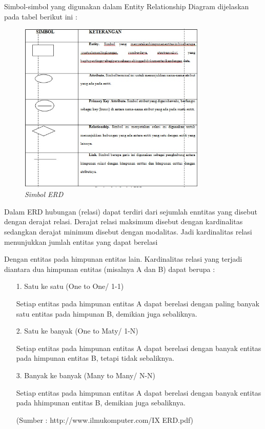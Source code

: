 \documentclass{jtetiproposalskripsi}
\begin{document}
Simbol-simbol yang digunakan dalam Entity Relationship Diagram dijelaskan pada tabel berikut ini :
\begin{figure}[ht!]
\centering
\includegraphics[width=0.8\textwidth]{gambar/Simbol-ERD}
\caption{\textit{Simbol ERD}}
\label{wsn}
\end{figure}
\newpage

Dalam ERD hubungan (relasi) dapat terdiri dari sejumlah enntitas yang disebut dengan derajat relasi. Derajat relasi maksimum disebut dengan kardinalitas sedangkan derajat minimum disebut dengan modalitas. Jadi kardinalitas relasi menunjukkan jumlah entitas yang dapat berelasi
	
Dengan entitas pada himpunan entitas lain. Kardinalitas relasi yang terjadi diantara dua himpunan entitas (misalnya A dan B) dapat berupa :
\begin{itemize}

\item[1.]	Satu ke satu (One to One/ 1-1)

Setiap entitas pada himpunan entitas A dapat berelasi dengan paling banyak satu entitas pada himpunan B, demikian juga sebaliknya.
\item[2.]	Satu ke banyak (One to Maty/ 1-N)

Setiap entitas pada himpunan entitas A dapat berelasi dengan banyak entitas pada himpunan entitas B, tetapi tidak sebaliknya.
\item[3.]	Banyak ke banyak (Many to Many/ N-N)

Setiap entitas pada himpunan entitas A dapat berelasi dengan banyak entitas pada hhimpunan entitas B, demikian juga sebaliknya.

(Sumber : http://www.ilmukomputer.com/IX ERD.pdf)
\end{itemize}
\end{document}
